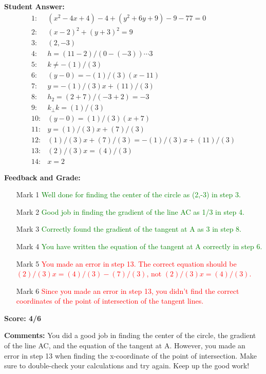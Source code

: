 \documentclass{article}
\begin{document}
\textbf{Student Answer:}
\begin{align*}
1: & (x^{2}-4x+4)-4+(y^{2}+6y+9)-9-77=0 \\
2: & (x-2)^{2}+(y+3)^{2}=9 \\
3: & (2,-3) \\
4: & h=(11-2)/(0-(-3))\cdots3 \\
5: & k\neq-(1)/(3) \\
6: & (y-0)=-(1)/(3)(x-11) \\
7: & y=-(1)/(3)x+(11)/(3) \\
8: & h_2=(2+7)/(-3+2)=-3 \\
9: & k_{\perp} k=(1)/(3) \\
10: & (y-0)=(1)/(3)(x+7) \\
11: & y=(1)/(3)x+(7)/(3) \\
12: & (1)/(3)x+(7)/(3)=-(1)/(3)x+(11)/(3) \\
13: & (2)/(3)x=(4)/(3) \\
14: & x=2
\end{align*}

\textbf{Feedback and Grade:}
\begin{itemize}
\item[Mark 1] \textcolor{green}{Well done for finding the center of the circle as (2,-3) in step 3.}
\item[Mark 2] \textcolor{green}{Good job in finding the gradient of the line AC as 1/3 in step 4.}
\item[Mark 3] \textcolor{green}{Correctly found the gradient of the tangent at A as 3 in step 8.}
\item[Mark 4] \textcolor{green}{You have written the equation of the tangent at A correctly in step 6.}
\item[Mark 5] \textcolor{red}{You made an error in step 13. The correct equation should be $(2)/(3)x=(4)/(3)- (7)/(3)$, not $(2)/(3)x=(4)/(3)$.}
\item[Mark 6] \textcolor{red}{Since you made an error in step 13, you didn't find the correct coordinates of the point of intersection of the tangent lines.}
\end{itemize}

\textbf{Score: 4/6}

\textbf{Comments:} You did a good job in finding the center of the circle, the gradient of the line AC, and the equation of the tangent at A. However, you made an error in step 13 when finding the x-coordinate of the point of intersection. Make sure to double-check your calculations and try again. Keep up the good work!
\end{document}
